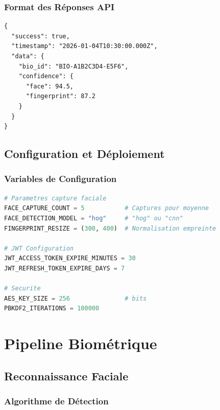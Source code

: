 \documentclass[12pt,a4paper]{report}
\begin{document}
\subsection{Format des Réponses API}

\begin{lstlisting}[caption={Format de réponse API},language={}]
{
  "success": true,
  "timestamp": "2026-01-04T10:30:00.000Z",
  "data": {
    "bio_id": "BIO-A1B2C3D4-E5F6",
    "confidence": {
      "face": 94.5,
      "fingerprint": 87.2
    }
  }
}
\end{lstlisting}

\section{Configuration et Déploiement}

\subsection{Variables de Configuration}

\begin{lstlisting}[caption={Configuration principale (config.py)},language=Python]
# Parametres capture faciale
FACE_CAPTURE_COUNT = 5           # Captures pour moyenne
FACE_DETECTION_MODEL = "hog"     # "hog" ou "cnn"
FINGERPRINT_RESIZE = (300, 400)  # Normalisation empreinte

# JWT Configuration
JWT_ACCESS_TOKEN_EXPIRE_MINUTES = 30
JWT_REFRESH_TOKEN_EXPIRE_DAYS = 7

# Securite
AES_KEY_SIZE = 256               # bits
PBKDF2_ITERATIONS = 100000
\end{lstlisting}

\chapter{Pipeline Biométrique}

\section{Reconnaissance Faciale}

\subsection{Algorithme de Détection}
\end{document}
